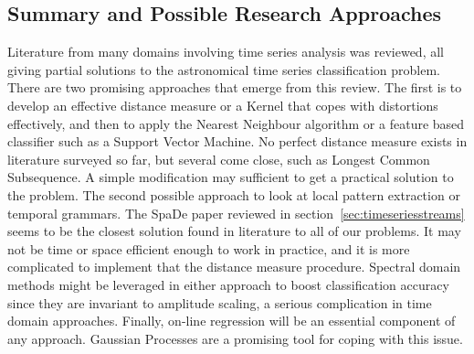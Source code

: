 	\subsection{Summary and Possible Research Approaches}
	Literature from many domains involving time series analysis was reviewed, all giving partial solutions to the astronomical time series classification problem. There are two promising approaches that emerge from this review. The first is to develop an effective distance measure or a Kernel that copes with distortions effectively, and then to apply the Nearest Neighbour algorithm or a feature based classifier such as a Support Vector Machine. No perfect distance measure exists in literature surveyed so far, but several come close, such as Longest Common Subsequence. A simple modification may sufficient to get a practical solution to the problem. The second possible approach to look at local pattern extraction or temporal grammars. The SpaDe paper reviewed in section~\ref{sec:timeseriesstreams} seems to be the closest solution found in literature to all of our problems. It may not be time or space efficient enough to work in practice, and it is more complicated to implement that the distance measure procedure. Spectral domain methods might be leveraged in either approach to boost classification accuracy since they are invariant to amplitude scaling, a serious complication in time domain approaches. Finally, on-line regression will be an essential component of any approach. Gaussian Processes are a promising tool for coping with this issue.
	
%	
%
